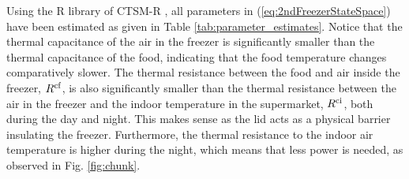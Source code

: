 Using the R library of CTSM-R \cite{juhl2016ctsmr}, all parameters in (\ref{eq:2ndFreezerStateSpace}) have been estimated as given in Table \ref{tab:parameter_estimates}. Notice that the thermal capacitance of the air in the freezer is significantly smaller than the thermal capacitance of the food, indicating  that the food temperature changes comparatively slower. The thermal resistance between the food and air inside the freezer, $R^{\rm{cf}}$, is also significantly smaller than the thermal resistance between the air in the freezer and the indoor temperature in the supermarket, $R^{\rm{ci}}$, both during the day and night. This makes sense as the lid acts as a physical barrier insulating the freezer. Furthermore, the thermal resistance to the indoor air temperature is higher during the night, which means that less power is needed, as  observed in Fig. \ref{fig:chunk}.


